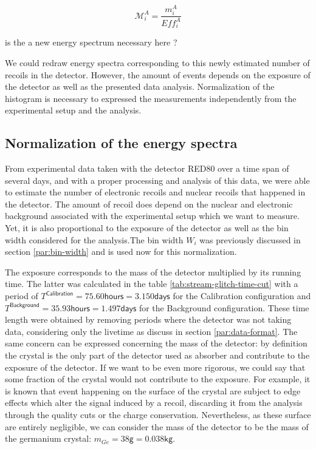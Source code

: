 \begin{equation}
\label{eq:efficiency-correction}
\mathcal{M}_{i}^{A} = \frac{ m_{i}^{A} }{ Eff_{i}^{A} }
\end{equation}

{\color{red} is the a new energy spectrum necessary here ?}

We could redraw energy spectra corresponding to this newly estimated number of recoils in the detector. However, the amount of events depends on the exposure of the detector as well as the presented data analysis. Normalization of the histogram is necessary to expressed the measurements independently from the experimental setup and the analysis.


\subsection{Normalization of the energy spectra}

From experimental data taken with the detector RED80 over a time span of several days, and with a proper processing and analysis of this data, we were able to estimate the number of electronic recoils and nuclear recoils that happened in the detector.
The amount of recoil does depend on the nuclear and electronic background associated with the experimental setup which we want to measure. Yet, it is also proportional to the exposure of the detector as well as the bin width considered for the analysis.The bin width $W_i$ was previously discussed in section \ref{par:bin-width} and is used now for this normalization.

The exposure corresponds to the mass of the detector multiplied by its running time. The latter was calculated in the table \ref{tab:stream-glitch-time-cut} with a period of $T^{\textsf{Calibration}} = 75.60 \textsf{hours} = 3.150 \textsf{days}$ for the Calibration configuration and $T^{\textsf{Background}} = 35.93 \textsf{hours} = 1.497 \textsf{days}$ for the Background configuration. These time length were obtained by removing periods where the detector was not taking data, considering only the livetime as discuss in section \ref{par:data-format}. The same concern can be expressed concerning the mass of the detector: by definition the crystal is the only part of the detector used as absorber and contribute to the exposure of the detector. If we want to be even more rigorous, we could say that some fraction of the crystal would not contribute to the exposure. For example, it is known that event happening on the surface of the crystal are subject to edge effects which alter the signal induced by a recoil, discarding it from the analysis through the quality cuts or the charge conservation. Nevertheless, as these surface are entirely negligible, we can consider the mass of the detector to be the mass of the germanium crystal: $m_{Ge} = 38 \textsf{g} = 0.038 \textsf{kg} $.

